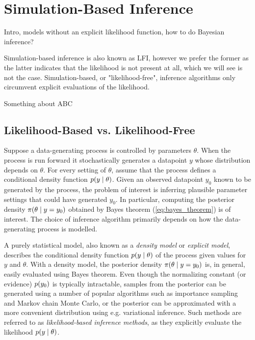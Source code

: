 


\chapter{Simulation-Based Inference}\label{chap:LFI}

Intro, models without an explicit likelihood function, how to do Bayesian inference?

Simulation-based inference is also known as LFI, however we prefer the former as the latter indicates that the likelihood is not present at all, which we will see is not the case. Simulation-based, or "likelihood-free", inference algorithms only circumvent explicit evaluations of the likelihood. 

Something about ABC

\section{Likelihood-Based vs. Likelihood-Free}

Suppose a data-generating process is controlled by parameters $\theta$. When the process is run forward it stochastically generates a datapoint $y$ whose distribution depends on $\theta$. For every setting of $\theta$, assume that the process defines a conditional density function $p \qty(y \mid \theta)$. Given an observed datapoint $y_0$ known to be generated by the process, the problem of interest is inferring plausible parameter settings that could have generated $y_0$. In particular, computing the posterior density $\pi \qty(\theta \mid y=y_0)$ obtained by Bayes theorem (\autoref{eq:bayes_theorem}) is of interest. The choice of inference algorithm primarily depends on how the data-generating process is modelled.

A purely statistical model, also known as a \textit{density model} or \textit{explicit model}, describes the conditional density function $p \qty(y \mid \theta)$ of the process given values for $y$ and $\theta$. With a density model, the posterior density $\pi \qty(\theta \mid y=y_0)$ is, in general, easily evaluated using Bayes theorem. Even though the normalizing constant (or evidence) $p\qty(y_0)$ is typically intractable, samples from the posterior can be generated using a number of popular algorithms such as importance sampling and Markov chain Monte Carlo, or the posterior can be approximated with a more convenient distribution using e.g. variational inference. Such methods are referred to as \textit{likelihood-based inference methods}, as they explicitly evaluate the likelihood $p \qty(y \mid \theta)$.

